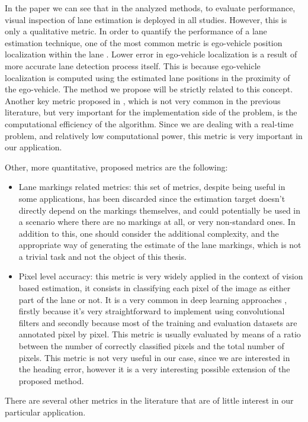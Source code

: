 \documentclass[a4paper,12pt,sort&compress]{article}
\begin{document}
    In the paper \citep*{6977166} we can see that in the analyzed methods, to evaluate performance,
    visual inspection of lane estimation is deployed in all studies. However, this is only a
    qualitative metric. In order to quantify the performance of a lane estimation technique, one of
    the most common metric is ego-vehicle position localization within the lane \citep*{1603550,cheng2007lane,6728507}.
    Lower error in ego-vehicle localization is a result of more accurate lane detection process
    itself. This is because ego-vehicle localization is computed using the estimated lane positions
    in the proximity of the ego-vehicle. The method we propose will be strictly related to this
    concept. Another key metric proposed in \citep*{6977166}, which is not very common in the
    previous literature, but very important for the implementation side of the problem, is the
    computational efficiency of the algorithm. Since we are dealing with a real-time problem, and
    relatively low computational power, this metric is very important in our application.

    Other, more quantitative, proposed metrics are the following:
    \begin{itemize}
        \item Lane markings related metrics: this set of metrics, despite being useful in some
        applications, has been discarded since the estimation target doesn't directly depend on the
        markings themselves, and could potentially be used in a scenario where there are no
        markings at all, or very non-standard ones. In addition to this, one should consider the
        additional complexity, and the appropriate way of generating the estimate of the lane
        markings, which is not a trivial task and not the object of this thesis.
        \item Pixel level accuracy: this metric is very widely applied in the context of vision
        based estimation, it consists in classifying each pixel of the image as either part of the
        lane or not. It is a very common in deep learning approaches \citep*{9398517}, firstly because it's very
        straightforward to implement using convolutional filters and secondly because most of the
        training and evaluation datasets are annotated pixel by pixel. This metric is usually
        evaluated by means of a ratio between the number of correctly classified pixels and the
        total number of pixels. This metric is not very useful in our case, since we are
        interested in the heading error, however it is a very interesting possible extension of the
        proposed method.
    \end{itemize}
    There are several other metrics in the literature that are of little interest in our particular
    application.  
\end{document}
